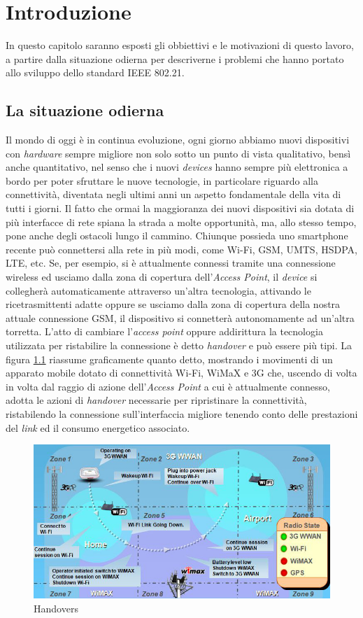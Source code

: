 \chapter{Introduzione}
In questo capitolo saranno esposti gli obbiettivi e le motivazioni di questo lavoro, a partire dalla situazione odierna per descriverne i problemi che hanno portato allo sviluppo dello standard IEEE 802.21.

\section{La situazione odierna}
Il mondo di oggi è in continua evoluzione, ogni giorno abbiamo nuovi dispositivi con {\em hardware} sempre migliore non solo sotto un punto di vista qualitativo, bensì anche quantitativo, nel senso che i nuovi {\em devices} hanno sempre più elettronica a bordo per poter sfruttare le nuove tecnologie, in particolare riguardo alla connettività, diventata negli ultimi anni un aspetto fondamentale della vita di tutti i giorni. Il fatto che ormai la maggioranza dei nuovi dispositivi sia dotata di più interfacce di rete spiana la strada a molte opportunità, ma, allo stesso tempo, pone anche degli ostacoli lungo il cammino.
Chiunque possieda uno smartphone recente può connettersi alla rete in più modi, come Wi-Fi, GSM, UMTS, HSDPA, LTE, etc. Se, per esempio, si è attualmente connessi tramite una connessione wireless ed usciamo dalla zona di copertura dell'{\em Access Point}, il {\em device} si collegherà automaticamente attraverso un'altra tecnologia, attivando le ricetrasmittenti adatte oppure se usciamo dalla zona di copertura della nostra attuale connessione GSM, il dispositivo si connetterà autonomamente ad un'altra torretta. L'atto di cambiare l'{\em access point} oppure addirittura la tecnologia utilizzata per ristabilire la connessione è detto {\em handover} e può essere più tipi. La figura \ref{fig:handovers} riassume graficamente quanto detto, mostrando i movimenti di un apparato mobile dotato di connettività Wi-Fi, WiMaX e 3G che, uscendo di volta in volta dal raggio di azione dell'{\em Access Point} a cui è attualmente connesso, adotta le azioni di {\em handover} necessarie per ripristinare la connettività, ristabilendo la connessione sull'interfaccia migliore tenendo conto delle prestazioni del {\em link} ed il consumo energetico associato.

\begin{figure}[h!]
\centering
\includegraphics[scale=0.55]{handovers.jpg}
\caption{Handovers}
\label{fig:handovers}
\end{figure}

